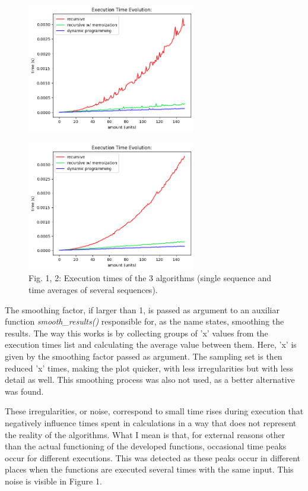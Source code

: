 \documentclass[shortpaper]{revdetua}
\begin{document}
\newpage
\vspace{-10pt}
\begin{figure}[H]
    \centering
    \setlength{\belowcaptionskip}{-10pt}
    \includegraphics[width=2.9in]{../results/simple/tCMP_simple_results_plot_[15].png}
    \caption{}
\end{figure}
\vspace{-35pt}
\begin{figure}[H]
    \centering
    \setlength{\belowcaptionskip}{-10pt}
    \includegraphics[width=2.9in]{../results/elaborate/tCMP_elaborate_results_plot_[15].png}
    \caption{Fig. 1, 2: Execution times of the 3 algorithms (single sequence and time averages of several sequences).}
\end{figure}

The smoothing factor, if larger than 1, is passed as argument to an auxiliar 
function {\it smooth\_results()\/} responsible for, as the name states,
smoothing the results.
The way this works is by collecting groups of 'x' values from the execution 
times list and calculating the average value between them.
Here, 'x' is given by the smoothing factor passed as argument.
The sampling set is then reduced 'x' times, making the plot quicker, with less
irregularities but with less detail as well.
This smoothing process was also not used, as a better alternative was found.

These irregularities, or noise, correspond to small time rises during execution 
that negatively influence times spent in calculations in a way that does not 
represent the reality of the algorithms.
What I mean is that, for external reasons other than the actual functioning of 
the developed functions, occasional time peaks occur for different executions.
This was detected as these peaks occur in different places when the functions 
are executed several times with the same input.
This noise is visible in Figure 1. \\
\end{document}
